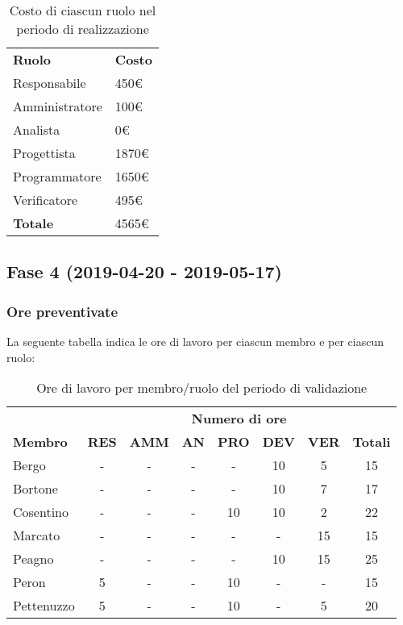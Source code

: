 		\begin{table}[h]
			\centering
			\begin{tabular}{| l | l |}
				\rowcolor{LightBlue}
				\textbf{\color{white}Ruolo}
				& \textbf{\color{white}Costo}\\
				
				Responsabile 		& 450€\\
				Amministratore 	& 100€\\
				Analista 				& 0€\\			
				Progettista 			& 1870€\\
				Programmatore 		& 1650€\\
				Verificatore 		& 495€\\ \hline
				\textbf{Totale} 	& 4565€\\ \hline
			\end{tabular}
			\caption{Costo di ciascun ruolo nel periodo di realizzazione}
		\end{table}
		
\newpage
\subsection{Fase 4 (2019-04-20 - 2019-05-17)}
	\subsubsection{Ore preventivate}
		La seguente tabella indica le ore di lavoro per ciascun membro e per ciascun ruolo:
		\begin{table}[h]
			\centering
			\begin{tabular}{| l | c c c c c c | c |}
				\rowcolor{LightBlue}
				& \multicolumn{7}{c}{\textbf{\color{white}Numero di ore}}	\\
		
				\rowcolor{LightBlue}
				\textbf{\color{white}Membro}
				& \textbf{\color{white}RES}
				& \textbf{\color{white}AMM}
				& \textbf{\color{white}AN}
				& \textbf{\color{white}PRO}
				& \textbf{\color{white}DEV}
				& \textbf{\color{white}VER}
				& \textbf{\color{white}Totali}\\
	
				Bergo      & - & - & - & - & 10 & 5 & 15\\
				Bortone    & - & - & - & - & 10 & 7 & 17\\
				Cosentino  & - & - & - & 10 & 10 & 2 & 22\\
				Marcato    & - & - & - & - & - & 15 & 15\\
				Peagno     & - & - & - & - & 10 & 15 & 25\\
				Peron      & 5 & - & - & 10 & - & - & 15\\
				Pettenuzzo & 5 & - & - & 10 & - & 5 & 20\\ \hline
			\end{tabular}
			\caption{Ore di lavoro per membro/ruolo del periodo di validazione}
		\end{table}
		
